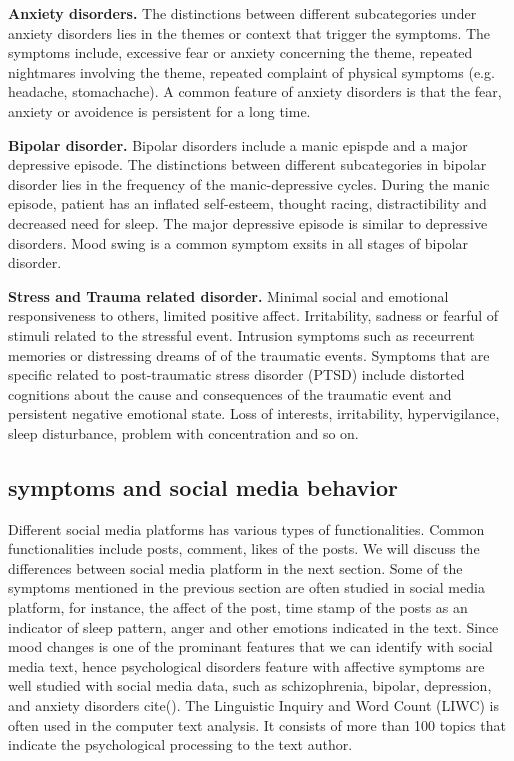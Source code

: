 \textbf{Anxiety disorders.} The distinctions between different subcategories under anxiety disorders lies in the themes or context that trigger the symptoms. The symptoms include,  excessive fear or anxiety concerning the theme, repeated nightmares involving the theme, repeated complaint of physical symptoms (e.g. headache, stomachache). A common feature of anxiety disorders is that the fear, anxiety or avoidence is persistent for a long time.


\textbf{Bipolar disorder.} Bipolar disorders include a manic epispde and a major depressive episode. The distinctions between different subcategories in bipolar disorder lies in the frequency of the manic-depressive cycles. During the manic episode, patient has an inflated self-esteem, thought racing, distractibility and decreased need for sleep. The major depressive episode is similar to depressive disorders. Mood swing is a common symptom exsits in all stages of bipolar disorder.

\textbf{Stress and Trauma related disorder.} Minimal social and emotional responsiveness to others, limited positive affect. Irritability, sadness or fearful of stimuli related to the stressful event. Intrusion symptoms such as receurrent memories or distressing dreams of of the traumatic events. Symptoms that are specific related to post-traumatic stress disorder (PTSD) include distorted cognitions about the cause and consequences of the traumatic event and persistent negative emotional state. Loss of interests, irritability, hypervigilance, sleep disturbance, problem with concentration and so on.

\subsection{symptoms and social media behavior}

Different social media platforms has various types of functionalities. Common functionalities include posts, comment, likes of the posts. We will discuss the differences between social media platform in the next section. Some of the symptoms mentioned in the previous section are often studied in social media platform, for instance, the affect of the post, time stamp of the posts as an indicator of sleep pattern, anger and other emotions indicated in the text. Since mood changes is one of the prominant features that we can identify with social media text, hence psychological disorders feature with affective symptoms are well studied with social media data, such as schizophrenia, bipolar, depression, and anxiety disorders cite(). The Linguistic Inquiry and Word Count (LIWC) is often used in the computer text analysis. It consists of more than 100 topics that indicate the psychological processing to the text author. 

